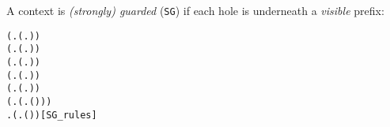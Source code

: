 A context is \emph{(strongly) guarded} (\texttt{SG}) if each hole is underneath a \emph{visible} prefix:
\begin{alltt}
\HOLTokenTurnstile{} (\HOLSymConst{\HOLTokenForall{}}.  (\HOLTokenLambda{}. )) \HOLSymConst{\HOLTokenConj{}}
   (\HOLSymConst{\HOLTokenForall{}} .   \HOLSymConst{\HOLTokenImp{}}  (\HOLTokenLambda{}.   )) \HOLSymConst{\HOLTokenConj{}}
   (\HOLSymConst{\HOLTokenForall{}} .   \HOLSymConst{\HOLTokenImp{}}  (\HOLTokenLambda{}.  )) \HOLSymConst{\HOLTokenConj{}}
   (\HOLSymConst{\HOLTokenForall{}} .   \HOLSymConst{\HOLTokenConj{}}   \HOLSymConst{\HOLTokenImp{}}  (\HOLTokenLambda{}.   \HOLSymConst{\ensuremath{+}}  )) \HOLSymConst{\HOLTokenConj{}}
   (\HOLSymConst{\HOLTokenForall{}} .   \HOLSymConst{\HOLTokenConj{}}   \HOLSymConst{\HOLTokenImp{}}  (\HOLTokenLambda{}.   \HOLSymConst{\ensuremath{\parallel}}  )) \HOLSymConst{\HOLTokenConj{}}
   (\HOLSymConst{\HOLTokenForall{}} .   \HOLSymConst{\HOLTokenImp{}}  (\HOLTokenLambda{}. \HOLSymConst{\ensuremath{\nu}}  ( ))) \HOLSymConst{\HOLTokenConj{}}
   \HOLSymConst{\HOLTokenForall{}} .   \HOLSymConst{\HOLTokenImp{}}  (\HOLTokenLambda{}.  ( ) )\hfill{[SG_rules]}
\end{alltt}

